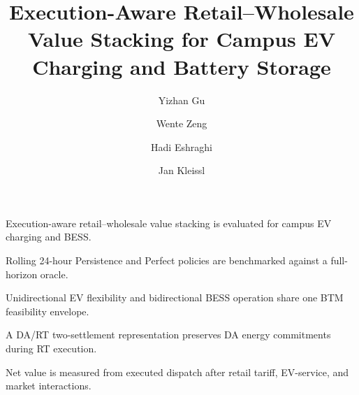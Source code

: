 \documentclass[final,5p,times]{elsarticle}
\begin{document}
\begin{frontmatter}

\title{Execution-Aware Retail--Wholesale Value Stacking for Campus EV Charging and Battery Storage}

\author[ucsd]{Yizhan Gu}
\author[totalenergies]{Wente Zeng}
\author[totalenergies]{Hadi Eshraghi}
\author[ucsd]{Jan Kleissl}



\begin{highlights}
\item Execution-aware retail--wholesale value stacking is evaluated for campus EV charging and BESS.
\item Rolling 24-hour Persistence and Perfect policies are benchmarked against a full-horizon oracle.
\item Unidirectional EV flexibility and bidirectional BESS operation share one BTM feasibility envelope.
\item A DA/RT two-settlement representation preserves DA energy commitments during RT execution.
\item Net value is measured from executed dispatch after retail tariff, EV-service, and market interactions.
\end{highlights}


\end{frontmatter}
\end{document}

